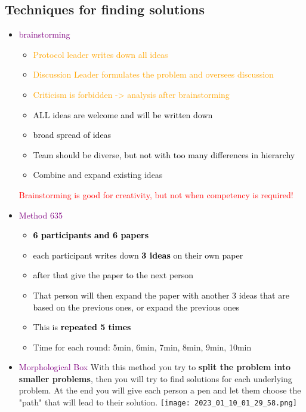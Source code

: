\documentclass[main.tex,fontsize=12pt,paper=a4,paper=landscape,DIV=calc,]{scrartcl}
\begin{document}
\begin{multicols*}{2}
\subsection{Techniques for finding solutions}
\begin{itemize}
\item \textcolor{purple}{brainstorming}\newline
  \begin{itemize}
  \item \textcolor{orange}{Protocol leader writes down all ideas}
  \item \textcolor{orange}{Discussion Leader formulates the problem and oversees discussion}
  \item \textcolor{orange}{Criticism is forbidden -> analysis after brainstorming}
  \item \textcolor{black}{ALL ideas are welcome and will be written down}
  \item \textcolor{black}{broad spread of ideas}
  \item \textcolor{black}{Team should be diverse, but not with too many differences in hierarchy}
  \item Combine and expand existing ideas
  \end{itemize}
  \textcolor{red}{Brainstorming is good for creativity, but not when competency is required!}
\item \textcolor{purple}{Method 635}\newline
  \begin{itemize}
    \item \textcolor{black}{\textbf{6 participants and 6 papers}}
    \item \textcolor{black}{each participant writes down \textbf{3 ideas} on their own paper}
  \item \textcolor{black}{after that give the paper to the next person}
  \item \textcolor{black}{That person will then expand the paper with another 3 ideas that are based on the previous ones, or expand the previous ones}
  \item \textcolor{black}{This is \textbf{repeated 5 times}}
  \item Time for each round: 5min, 6min, 7min, 8min, 9min, 10min
  \end{itemize} 
\item \textcolor{purple}{Morphological Box}
  With this method you try to \textbf{split the problem into smaller problems}, then you will try to find solutions for each underlying problem.\newline
  At the end you will give each person a pen and let them choose the "path" that will lead to their solution.\newline
  \texttt{[image: 2023\_01\_10\_01\_29\_58.png]}
\end{itemize} 


\end{multicols*}
\end{document}
